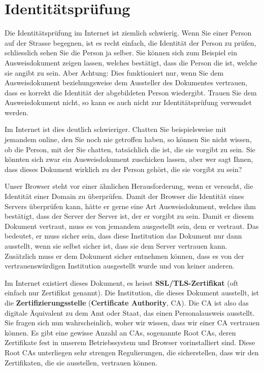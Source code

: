     \section{Identitätsprüfung}
        Die Identitätsprüfung im Internet ist ziemlich schwierig. Wenn Sie einer Person auf der Strasse begegnen, ist es recht einfach, die Identität der Person zu prüfen, schliesslich sehen Sie die Person ja selber. Sie können sich zum Beispiel ein Ausweisdokument zeigen lassen, welches bestätigt, dass die Person die ist, welche sie angibt zu sein. Aber Achtung: Dies funktioniert nur, wenn Sie dem Ausweisdokument beziehungsweise dem Aussteller des Dokumentes vertrauen, dass es korrekt die Identität der abgebildeten Person wiedergibt. Trauen Sie dem Ausweisdokument nicht, so kann es auch nicht zur Identitätsprüfung verwendet werden.

        Im Internet ist dies deutlich schwieriger. Chatten Sie beispielsweise mit jemandem online, den Sie noch nie getroffen haben, so können Sie nicht wissen, ob die Person, mit der Sie chatten, tatsächlich die ist, die sie vorgibt zu sein. Sie könnten sich zwar ein Ausweisdokument zuschicken lassen, aber wer sagt Ihnen, dass dieses Dokument wirklich zu der Person gehört, die sie vorgibt zu sein?

        Unser Browser steht vor einer ähnlichen Herausforderung, wenn er versucht, die Identität einer Domain zu überprüfen. Damit der Browser die Identität eines Servers überprüfen kann, hätte er gerne eine Art Ausweisdokument, welches ihm bestätigt, dass der Server der Server ist, der er vorgibt zu sein. Damit er diesem Dokument vertraut, muss es von jemandem ausgestellt sein, dem er vertraut. Das bedeutet, er muss sicher sein, dass diese Institution das Dokument nur dann ausstellt, wenn sie selbst sicher ist, dass sie dem Server vertrauen kann. Zusätzlich muss er dem Dokument sicher entnehmen können, dass es von der vertrauenswürdigen Institution ausgestellt wurde und von keiner anderen.

        Im Internet existiert dieses Dokument, es heisst \textbf{SSL/TLS-Zertifikat} (oft einfach nur Zertifikat genannt). Die Institution, die dieses Dokument ausstellt, ist die \textbf{Zertifizierungsstelle} (\textbf{Certificate Authority}, CA). Die CA ist also das digitale Äquivalent zu dem Amt oder Staat, das einen Personalausweis ausstellt. Sie fragen sich nun wahrscheinlich, woher wir wissen, dass wir einer CA vertrauen können. Es gibt eine gewisse Anzahl an CAs, sogenannte Root CAs, deren Zertifikate fest in unserem Betriebssystem und Browser vorinstalliert sind. Diese Root CAs unterliegen sehr strengen Regulierungen, die sicherstellen, dass wir den Zertifikaten, die sie ausstellen, vertrauen können.

